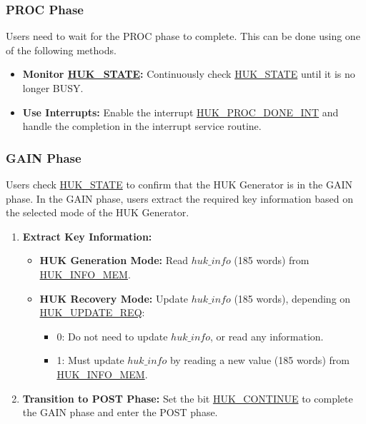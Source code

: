 \documentclass[main\_\_EN.tex]{subfiles}
\begin{document}
\subsubsection{PROC Phase}

Users need to wait for the PROC phase to complete. This can be done using one of the following methods.
\begin{itemize}
    \item \textbf{Monitor \hyperref[fielddesc:HUKSTATE]{HUK\_STATE}:} Continuously check \hyperref[fielddesc:HUKSTATE]{HUK\_STATE} until it is no longer BUSY.
    \item \textbf{Use Interrupts:} Enable the interrupt \hyperref[int:HUKPROCDONEINT]{HUK\_PROC\_DONE\_INT} and handle the completion in the interrupt service routine.
\end{itemize}


\subsubsection{GAIN Phase}

Users check \hyperref[fielddesc:HUKSTATE]{HUK\_STATE} to confirm that the HUK Generator is in the GAIN phase. In the GAIN phase, users extract the required key information based on the selected mode of the HUK Generator.
\begin{enumerate}
    \item \textbf{Extract Key Information:}
    \begin{itemize}
        \item \textbf{HUK Generation Mode:} Read \hyperref[para:hukinfo]{\begin{math}huk\_info\end{math}} (185 words) from \hyperref[mem:huk-info]{HUK\_INFO\_MEM}.
        \item \textbf{HUK Recovery Mode:} Update \hyperref[para:hukinfo]{\begin{math}huk\_info\end{math}} (185 words), depending on \hyperref[fielddesc:HUKUPDATEREQ]{HUK\_UPDATE\_REQ}:
        \begin{itemize}
            \item 0: Do not need to update \hyperref[para:hukinfo]{\begin{math}huk\_info\end{math}}, or read any information.
            \item 1: Must update \hyperref[para:hukinfo]{\begin{math}huk\_info\end{math}} by reading a new value (185 words) from \hyperref[mem:huk-info]{HUK\_INFO\_MEM}.
        \end{itemize}
    \end{itemize}
    \item \textbf{Transition to POST Phase:} Set the bit \hyperref[fielddesc:HUKCONTINUE]{HUK\_CONTINUE} to complete the GAIN phase and enter the POST phase.
\end{enumerate}
\end{document}
